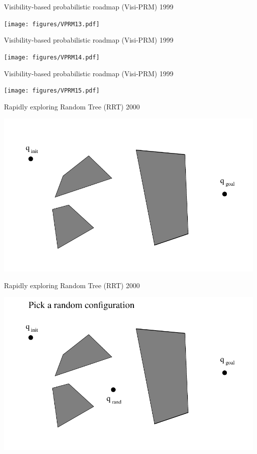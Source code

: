 \begin{frame} {Visibility-based probabilistic roadmap (Visi-PRM) 1999}
\centerline {
  \texttt{[image: figures/VPRM13.pdf]}
}
\end{frame}

\begin{frame} {Visibility-based probabilistic roadmap (Visi-PRM) 1999}
\centerline {
  \texttt{[image: figures/VPRM14.pdf]}
}
\end{frame}

\begin{frame} {Visibility-based probabilistic roadmap (Visi-PRM) 1999}
\centerline {
  \texttt{[image: figures/VPRM15.pdf]}
}
\end{frame}

%
%

\begin{frame} {Rapidly exploring Random Tree (RRT) 2000}
\centerline {
  \includegraphics[width=.8\linewidth]{figures/RRT00.pdf}
}
\end{frame}

\begin{frame} {Rapidly exploring Random Tree (RRT) 2000}
\centerline {
  \includegraphics[width=.8\linewidth]{figures/RRT01.pdf}
}
\end{frame}

